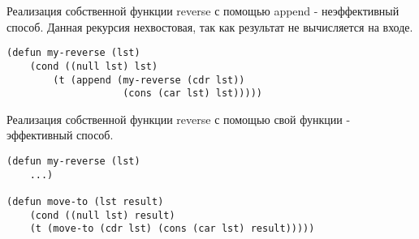 Реализация собственной функции reverse с помощью append - неэффективный способ. Данная рекурсия нехвостовая, так как результат не вычисляется на входе.
\begin{lstlisting}
(defun my-reverse (lst)
	(cond ((null lst) lst)
		(t (append (my-reverse (cdr lst))
					(cons (car lst) lst)))))
\end{lstlisting}

Реализация собственной функции reverse с помощью свой функции - эффективный способ.
\begin{lstlisting}
(defun my-reverse (lst)
	...)

(defun move-to (lst result)
	(cond ((null lst) result)
	(t (move-to (cdr lst) (cons (car lst) result)))))
\end{lstlisting}